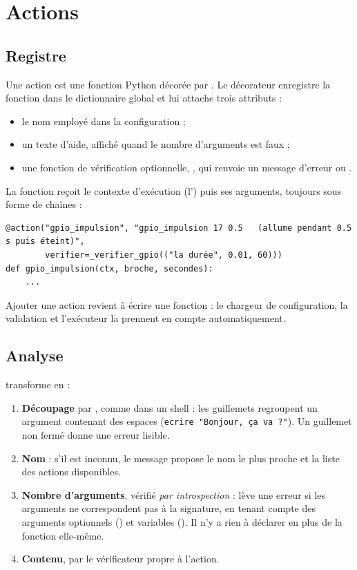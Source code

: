\chapter{Actions}
\label{chap:actions}

\section{Registre}

Une action est une fonction Python décorée par . Le décorateur enregistre la fonction dans le dictionnaire global  et lui attache trois attributs :
\begin{itemize}
  \item le nom employé dans la configuration ;
  \item un texte d'aide, affiché quand le nombre d'arguments est faux ;
  \item une fonction de vérification optionnelle, , qui renvoie un message d'erreur ou .
\end{itemize}
La fonction reçoit le contexte d'exécution (l') puis ses arguments, toujours sous forme de chaînes :

\begin{lstlisting}
@action("gpio_impulsion", "gpio_impulsion 17 0.5   (allume pendant 0.5 s puis éteint)",
        verifier=_verifier_gpio(("la durée", 0.01, 60)))
def gpio_impulsion(ctx, broche, secondes):
    ...
\end{lstlisting}

Ajouter une action revient à écrire une fonction : le chargeur de configuration, la validation et l'exécuteur la prennent en compte automatiquement.

\section{Analyse}

 transforme  en  :

\begin{enumerate}
  \item \textbf{Découpage} par , comme dans un shell : les guillemets regroupent un argument contenant des espaces (\texttt{ecrire "Bonjour, ça va ?"}). Un guillemet non fermé donne une erreur lisible.
  \item \textbf{Nom} : s'il est inconnu, le message propose le nom le plus proche et la liste des actions disponibles.
  \item \textbf{Nombre d'arguments}, vérifié \emph{par introspection} :  lève une erreur si les arguments ne correspondent pas à la signature, en tenant compte des arguments optionnels () et variables (). Il n'y a rien à déclarer en plus de la fonction elle-même.
  \item \textbf{Contenu}, par le vérificateur propre à l'action.
\end{enumerate}

